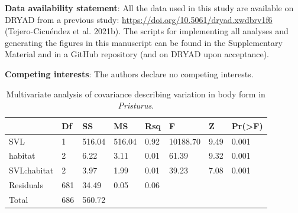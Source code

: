 \documentclass[
  11pt,
]{article}
\begin{document}
\textbf{Data availability statement}: All the data used in this study
are available on DRYAD from a previous study:
\url{https://doi.org/10.5061/dryad.xwdbrv1f6} (Tejero-Cicuéndez et al.
2021b). The scripts for implementing all analyses and generating the
figures in this manuscript can be found in the Supplementary Material
and in a GitHub repository (and on DRYAD upon acceptance).

\textbf{Competing interests}: The authors declare no competing
interests.

\newpage

\begin{table}[H]

\caption{\label{tab:unnamed-chunk-1}Multivariate analysis of covariance describing variation in body form in \textit{Pristurus}.}
\centering
\begin{tabular}[t]{llllllll}
\toprule
  & Df & SS & MS & Rsq & F & Z & Pr(>F)\\
\midrule
SVL & 1 & 516.04 & 516.04 & 0.92 & 10188.70 & 9.49 & 0.001\\
habitat & 2 & 6.22 & 3.11 & 0.01 & 61.39 & 9.32 & 0.001\\
SVL:habitat & 2 & 3.97 & 1.99 & 0.01 & 39.23 & 7.08 & 0.001\\
Residuals & 681 & 34.49 & 0.05 & 0.06 &  &  & \\
Total & 686 & 560.72 &  &  &  &  & \\
\bottomrule
\end{tabular}
\end{table}

\newpage
\end{document}
